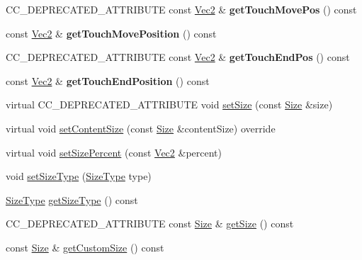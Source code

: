 \begin{DoxyCompactItemize}
\item 
\mbox{\label{classui_1_1Widget_a826436211ac2fec2eadbbcd8ff7489c0}} 
C\+C\+\_\+\+D\+E\+P\+R\+E\+C\+A\+T\+E\+D\+\_\+\+A\+T\+T\+R\+I\+B\+U\+TE const \hyperlink{classVec2}{Vec2} \& {\bfseries get\+Touch\+Move\+Pos} () const
\item 
\mbox{\label{classui_1_1Widget_aad38a5fdbff764b70e1431ced2e71b7d}} 
const \hyperlink{classVec2}{Vec2} \& {\bfseries get\+Touch\+Move\+Position} () const
\item 
\mbox{\label{classui_1_1Widget_a1b15dc85b15a2c4c007eda6914be8c0e}} 
C\+C\+\_\+\+D\+E\+P\+R\+E\+C\+A\+T\+E\+D\+\_\+\+A\+T\+T\+R\+I\+B\+U\+TE const \hyperlink{classVec2}{Vec2} \& {\bfseries get\+Touch\+End\+Pos} () const
\item 
\mbox{\label{classui_1_1Widget_a1d147aab81b3579ecf5e0b39c65bf947}} 
const \hyperlink{classVec2}{Vec2} \& {\bfseries get\+Touch\+End\+Position} () const
\item 
virtual C\+C\+\_\+\+D\+E\+P\+R\+E\+C\+A\+T\+E\+D\+\_\+\+A\+T\+T\+R\+I\+B\+U\+TE void \hyperlink{classui_1_1Widget_abdbcc81799b57a3124812fe0ec1929cf}{set\+Size} (const \hyperlink{classSize}{Size} \&size)
\item 
virtual void \hyperlink{classui_1_1Widget_af5f35184ff3de275929e937f81a4ae30}{set\+Content\+Size} (const \hyperlink{classSize}{Size} \&content\+Size) override
\item 
virtual void \hyperlink{classui_1_1Widget_a326cd8ebfd27b65d8def2976daa8481d}{set\+Size\+Percent} (const \hyperlink{classVec2}{Vec2} \&percent)
\item 
void \hyperlink{classui_1_1Widget_a0227da458f10e9f3bcb4e2137a0a05e5}{set\+Size\+Type} (\hyperlink{classui_1_1Widget_ab7035fc10a00c756523be6bc57cf801c}{Size\+Type} type)
\item 
\hyperlink{classui_1_1Widget_ab7035fc10a00c756523be6bc57cf801c}{Size\+Type} \hyperlink{classui_1_1Widget_a1a8759b49fc2330ab8b106d887914474}{get\+Size\+Type} () const
\item 
C\+C\+\_\+\+D\+E\+P\+R\+E\+C\+A\+T\+E\+D\+\_\+\+A\+T\+T\+R\+I\+B\+U\+TE const \hyperlink{classSize}{Size} \& \hyperlink{classui_1_1Widget_ab6472f25eaef98668803f15623bf89cb}{get\+Size} () const
\item 
const \hyperlink{classSize}{Size} \& \hyperlink{classui_1_1Widget_ade1b14056d19b18729a41efb43964ab3}{get\+Custom\+Size} () const

\end{DoxyCompactItemize}
